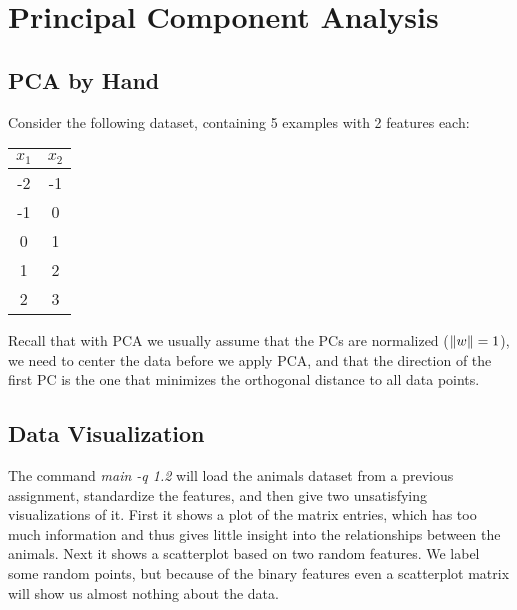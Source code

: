 \documentclass{article}
\begin{document}
\section{Principal Component Analysis}

\subsection{PCA by Hand}


Consider the following dataset, containing 5 examples with 2 features each:
\begin{center}
\begin{tabular}{cc}
$x_1$ & $x_2$\\
\hline
-2 & -1\\
-1 & 0\\
0 & 1\\
1 & 2\\
2 & 3\\
\end{tabular}
\end{center}
Recall that with PCA we usually assume that the PCs are normalized ($\|w\| = 1$), we need to center the data before we apply PCA, and that the direction of the first PC is the one that minimizes the orthogonal distance to all data points.



\subsection{Data Visualization}

The command \emph{main -q 1.2} will load the animals dataset from a previous assignment, standardize the features, and then give two unsatisfying visualizations of it. 
First it shows a plot of the matrix entries, which has too much information and thus gives little insight into the relationships between the animals. 
Next it shows a scatterplot based on two random features. 
We label some random points, but because of the binary features even a scatterplot matrix will show us almost nothing about the data.
\end{document}
